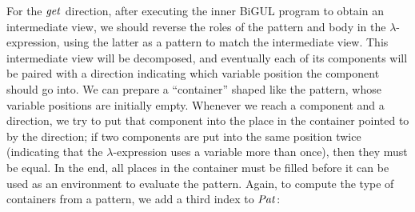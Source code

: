 For the \ensuremath{\Varid{get}} direction, after executing the inner BiGUL program to obtain an intermediate view, we should reverse the roles of the pattern and body in the $\lambda$-expression, using the latter as a pattern to match the intermediate view.
This intermediate view will be decomposed, and eventually each of its components will be paired with a direction indicating which variable position the component should go into.
We can prepare a ``container'' shaped like the pattern, whose variable positions are initially empty.
Whenever we reach a component and a direction, we try to put that component into the place in the container pointed to by the direction; if two components are put into the same position twice (indicating that the $\lambda$-expression uses a variable more than once), then they must be equal.
In the end, all places in the container must be filled before it can be used as an environment to evaluate the pattern.
Again, to compute the type of containers from a pattern, we add a third index to \ensuremath{\Conid{Pat}}:
